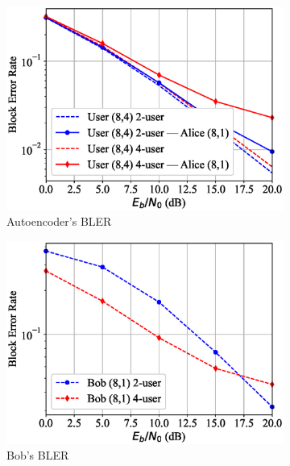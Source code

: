 \begin{figure}[tp!]
	\begin{subfigure}{0.28\textwidth}
		\includegraphics[width=\linewidth]{figs/multi_covert_autoencoder_bler_rayleigh}
		\caption{Autoencoder's BLER}
		\label{fig:multi_rayleigh_results_ae}
	\end{subfigure}
	\hspace*{\fill}
	\begin{subfigure}{0.28\textwidth}
		\includegraphics[width=\linewidth]{figs/multi_bob_bler_rayleigh}
		\caption{Bob's BLER}
		\label{fig:multi_rayleigh_results_bob}	
	\end{subfigure}
	\hspace*{\fill}
	\begin{subfigure}{0.28\textwidth}

\end{subfigure}
\end{figure}
